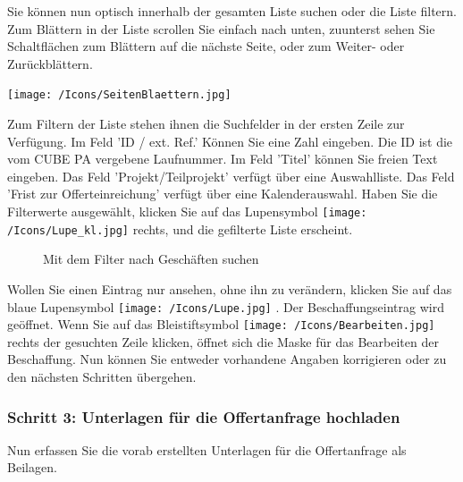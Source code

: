 \vspace{\baselineskip}

Sie können nun optisch innerhalb der gesamten Liste suchen oder die Liste filtern. Zum Blättern in der Liste scrollen Sie einfach nach unten, zuunterst sehen Sie Schaltflächen zum Blättern auf die nächste Seite, oder zum Weiter- oder Zurückblättern.

\begin{center}
\texttt{[image: /Icons/SeitenBlaettern.jpg]}
\end{center}

Zum Filtern der Liste stehen ihnen die Suchfelder in der ersten Zeile zur Verfügung. Im Feld 'ID / ext. Ref.' Können Sie eine Zahl eingeben. Die ID ist die vom CUBE PA vergebene Laufnummer. Im Feld 'Titel' können Sie freien Text eingeben. Das Feld 'Projekt/Teilprojekt' verfügt über eine Auswahlliste. Das Feld 'Frist zur Offerteinreichung' verfügt über eine Kalenderauswahl. Haben Sie die Filterwerte ausgewählt, klicken Sie auf das Lupensymbol \texttt{[image: /Icons/Lupe\_kl.jpg]}  rechts, und die gefilterte Liste erscheint.

\begin{figure}[H]
\caption{Mit dem Filter nach Geschäften suchen}
\end{figure}

Wollen Sie einen Eintrag nur ansehen, ohne ihn zu verändern, klicken Sie auf das blaue Lupensymbol \texttt{[image: /Icons/Lupe.jpg]} . Der Beschaffungseintrag wird geöffnet. Wenn Sie auf das Bleistiftsymbol \texttt{[image: /Icons/Bearbeiten.jpg]}  rechts der gesuchten Zeile klicken, öffnet sich die Maske für das Bearbeiten der Beschaffung.\textcolor{red}{ }Nun können Sie entweder vorhandene Angaben korrigieren oder zu den nächsten Schritten übergehen.

\subsubsection{Schritt 3: Unterlagen für die Offertanfrage hochladen}

Nun erfassen Sie die vorab erstellten Unterlagen für die Offertanfrage als Beilagen.

